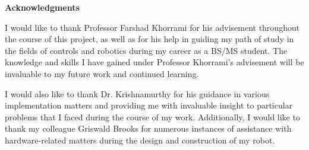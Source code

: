 \clearpage
\vspace*{\fill}
	\begin{center}
		\begin{minipage}{\textwidth}
			{\begin{center}\large{\textbf{Acknowledgments}}\end{center}}

			I would like to thank Professor Farshad Khorrami for his advisement throughout the course of this project, as well as for his help in guiding my path of study in the fields of controls and robotics during my career as a BS/MS student. The knowledge and skills I have gained under Professor Khorrami's advisement will be invaluable to my future work and continued learning. %
			
			\vspace{5mm}
			\hspace{5mm} 
			I would also like to thank Dr. Krishnamurthy for his guidance in various implementation matters and providing me with invaluable insight to particular problems that I faced during the course of my work. Additionally, I would like to thank my colleague Griswald Brooks for numerous instances of assistance with hardware-related matters during the design and construction of my robot. 
		\end{minipage}
	\end{center}
\vfill %
\clearpage
